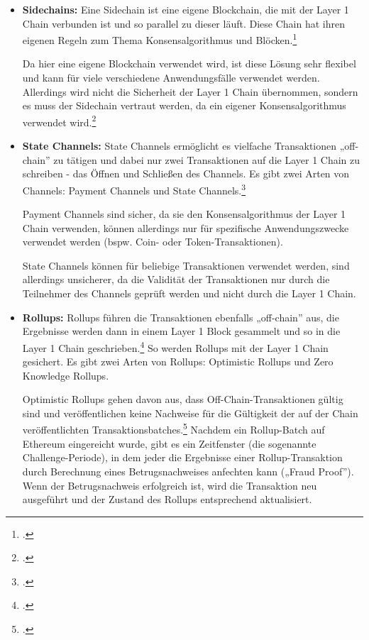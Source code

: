 \begin{itemize}
    \item \textbf{Sidechains:} 
    Eine Sidechain ist eine eigene Blockchain, die mit der Layer 1 Chain verbunden ist und so parallel zu dieser läuft. 
    Diese Chain hat ihren eigenen Regeln zum Thema Konsensalgorithmus und Blöcken.\footcite[Vgl. hierzu und weiterführend][]{w20}

    \noindent
    Da hier eine eigene Blockchain verwendet wird, ist diese Lösung sehr flexibel und kann für viele verschiedene Anwendungsfälle verwendet werden.
    Allerdings wird nicht die Sicherheit der Layer 1 Chain übernommen, sondern es muss der Sidechain vertraut werden, da ein eigener Konsensalgorithmus verwendet wird.\footcite[Vgl.][]{w21}


    \item \textbf{State Channels:}
    State Channels ermöglicht es vielfache Transaktionen „off-chain” zu tätigen und dabei nur zwei Transaktionen auf die Layer 1 Chain zu schreiben - das Öffnen und Schließen des Channels.
    Es gibt zwei Arten von Channels: Payment Channels und State Channels.\footcite[Vgl. hierzu und zum Folgenden sowie weiterführend][]{w19}

    \noindent
    Payment Channels sind sicher, da sie den Konsensalgorithmus der Layer 1 Chain verwenden, können allerdings nur für spezifische Anwendungszwecke verwendet werden (bspw. Coin- oder Token-Transaktionen).

    \noindent
    State Channels können für beliebige Transaktionen verwendet werden, sind allerdings unsicherer, da die Validität der Transaktionen nur durch die Teilnehmer des Channels geprüft werden und nicht durch die Layer 1 Chain.


    \item \textbf{Rollups:}
    Rollups führen die Transaktionen ebenfalls „off-chain” aus, die Ergebnisse werden dann in einem Layer 1 Block gesammelt und so in die Layer 1 Chain geschrieben.\footcite[Vgl. hierzu und zum Folgenden][]{w18} 
    So werden Rollups mit der Layer 1 Chain gesichert.
    Es gibt zwei Arten von Rollups: Optimistic Rollups und Zero Knowledge Rollups.

    \noindent
    Optimistic Rollups gehen davon aus, dass Off-Chain-Transaktionen gültig sind und veröffentlichen keine Nachweise für die Gültigkeit der auf der Chain veröffentlichten Transaktionsbatches.\footcite[Vgl. hierzu und zum Folgenden sowie weiterführend][]{w22}
    Nachdem ein Rollup-Batch auf Ethereum eingereicht wurde, gibt es ein Zeitfenster (die sogenannte Challenge-Periode), in dem jeder die Ergebnisse einer Rollup-Transaktion durch Berechnung eines Betrugsnachweises anfechten kann („Fraud Proof”).
    Wenn der Betrugsnachweis erfolgreich ist, wird die Transaktion neu ausgeführt und der Zustand des Rollups entsprechend aktualisiert.


\end{itemize}
